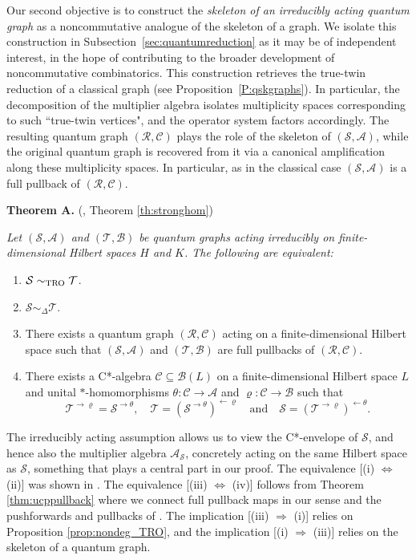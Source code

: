 \documentclass[11pt]{amsart}
\numberwithin{equation}{section}
\theoremstyle{plain}
\theoremstyle{definition}
\theoremstyle{remark}
\newcommand{\A}{{\mathcal{A}}}
\newcommand{\B}{{\mathcal{B}}}
\newcommand{\C}{{\mathcal{C}}}
\newcommand{\R}{{\mathcal{R}}}
\renewcommand{\S}{{\mathcal{S}}}
\newcommand{\T}{{\mathcal{T}}}
\newcommand{\qand}{\quad\text{and}\quad}
\begin{document}
Our second objective is to construct the \emph{skeleton of an irreducibly acting quantum graph} as a noncommutative analogue of the skeleton of a graph. We isolate this construction in Subsection~\ref{sec:quantumreduction} as it may be of independent interest, in the hope of contributing to the broader development of noncommutative combinatorics.
This construction retrieves the true-twin reduction of a classical graph (see Proposition~\ref{P:qskgraphs}). In particular, the decomposition of the multiplier algebra isolates multiplicity spaces corresponding to such ``true-twin vertices", and the operator system factors accordingly. The resulting quantum graph $(\R,\C)$ plays the role of the skeleton of $(\S,\A)$, while the original quantum graph is recovered from it via a canonical amplification along these multiplicity spaces. In particular, as in the classical case $(\S,\A)$ is a full pullback of $(\R,\C)$.

\medskip

\noindent
{\bf Theorem A.} (\cite[Theorem 7.5]{EKT21}, Theorem \ref{th:stronghom})
{\it Let $(\S,\A)$ and $(\T, \B)$ be quantum graphs acting irreducibly on finite-dimensional Hilbert spaces $H$ and $K$. The following are equivalent:
\begin{enumerate}
\item $\S \sim_{\rm TRO} \T$.
\item $\S \sim_{\Delta} \T$.
\item There exists a quantum graph $(\R,\C)$ acting on a finite-dimensional Hilbert space such that $(\S, \A)$ and $(\T, \B)$ are full pullbacks of $(\R, \C)$.
\item There exists a C*-algebra $\C \subseteq \B(L)$ on a finite-dimensional Hilbert space $L$ and unital $*$-homomorphisms $\theta\colon \C \to \A$ and $\varrho\colon \C \to \B$ such that
\[
\T^{\rightarrow \varrho} = \S^{\rightarrow \theta}, \quad 
\T = (\S^{\rightarrow \theta})^{\leftarrow \varrho} \qand 
\S = (\T^{\rightarrow \varrho})^{\leftarrow \theta}.
\]
\end{enumerate}
}

\medskip

The irreducibly acting assumption allows us to view the C*-envelope of $\S$, and hence also the multiplier algebra $\A_{\S}$, concretely acting on the same Hilbert space as $\S$, something that plays a central part in our proof. The equivalence [(i) $\Leftrightarrow$ (ii)] was shown in \cite[Theorem 7.5]{EKT21}.
The equivalence [(iii) $\Leftrightarrow$ (iv)] follows from Theorem \ref{thm:ucppullback} where we connect full pullback maps in our sense and the pushforwards and pullbacks of \cite{Wea12}. The implication [(iii) $\Rightarrow$ (i)] relies on Proposition \ref{prop:nondeg_TRO}, and the implication [(i) $\Rightarrow$ (iii)] relies on the skeleton of a quantum graph.
\end{document}
